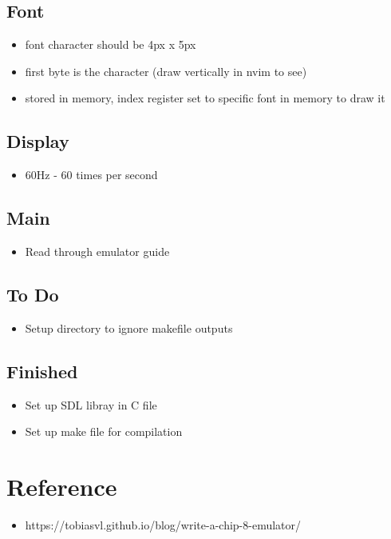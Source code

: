 \documentclass{article}
\begin{document}
\subsection*{Font}
\begin{itemize}
	\item font character should be 4px x 5px
	\item first byte is the character (draw vertically in nvim to see)
	\item stored in memory, index register set to specific font in memory to draw it
\end{itemize}
\subsection*{Display}
\begin{itemize}
	\item 60Hz - 60 times per second 
\end{itemize}
\subsection*{Main}
\begin{itemize}
	\item Read through emulator guide
\end{itemize}
\subsection*{To Do}
\begin{itemize}
	\item Setup directory to ignore makefile outputs
\end{itemize}

\subsection*{Finished}
\begin{itemize}
	\item Set up SDL libray in C file
	\item Set up make file for compilation
\end{itemize}


\section*{Reference}
\begin{itemize}
	\item https://tobiasvl.github.io/blog/write-a-chip-8-emulator/
\end{itemize}
\end{document}
